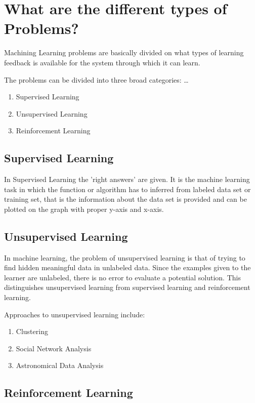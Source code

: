 \documentclass[a4paper, 12pt]{article}
\begin{document}
\section{What are the different types of Problems?}

Machining Learning problems are basically divided on what types of learning feedback is available for the system through which it can learn. 

The problems can be divided into three broad categories: \dots

\begin{enumerate}
\item Supervised Learning
\item Unsupervised Learning
\item Reinforcement Learning
\end{enumerate}

\subsection{Supervised Learning}

In Supervised Learning the 'right answers' are given. It is the machine learning task in which the function or algorithm has to inferred from labeled data set or training set, that is the information about the data set is provided and can be plotted on the graph with proper y-axis and x-axis.\\

\subsection{Unsupervised Learning}

In machine learning, the problem of unsupervised learning is that of trying to find hidden meaningful data in unlabeled data. Since the examples given to the learner are unlabeled, there is no error  to evaluate a potential solution. This distinguishes unsupervised learning from supervised learning and reinforcement learning.

Approaches to unsupervised learning include:
\begin{enumerate}
\item Clustering
\item Social Network Analysis
\item Astronomical Data Analysis
\end{enumerate}

\subsection{Reinforcement Learning}
\end{document}
